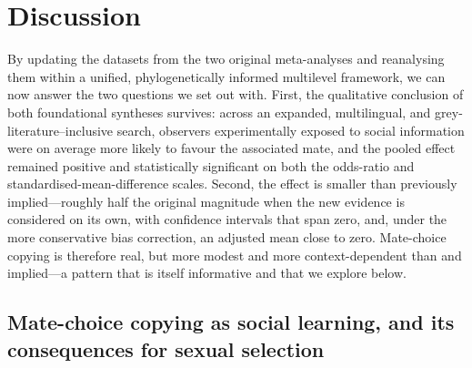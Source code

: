 \section{Discussion}

By updating the datasets from the two original meta-analyses and reanalysing them within a unified, phylogenetically informed multilevel framework, we can now answer the two questions we set out with. First, the qualitative conclusion of both foundational syntheses survives: across an expanded, multilingual, and grey-literature--inclusive search, observers experimentally exposed to social information were on average more likely to favour the associated mate, and the pooled effect remained positive and statistically significant on both the odds-ratio and standardised-mean-difference scales. Second, the effect is smaller than previously implied---roughly half the original magnitude when the new evidence is considered on its own, with confidence intervals that span zero, and, under the more conservative bias correction, an adjusted mean close to zero. Mate-choice copying is therefore real, but more modest and more context-dependent than \textcite{jonesMechanismsSocialInfluence2019} and \textcite{daviesMetaanalysisFactorsInfluencing2020} implied---a pattern that is itself informative and that we explore below.

\subsection{Mate-choice copying as social learning, and its consequences for sexual selection}

